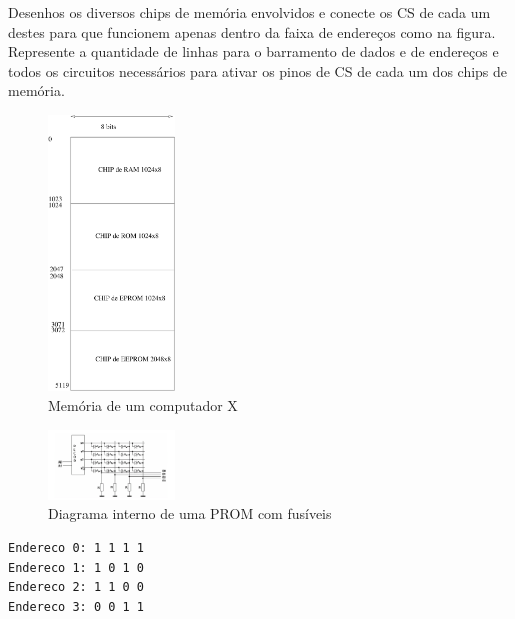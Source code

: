\documentclass[a4paper,10pt]{article}
\begin{document}
 Desenhos os diversos chips de memória envolvidos e conecte os CS de cada um destes para que funcionem apenas dentro da
faixa de endereços como na figura. Represente a quantidade de linhas para o barramento de dados e de endereços e todos os circuitos necessários para ativar os
pinos de CS de cada um dos chips de memória.


\begin{figure}[H]
 \centering\includegraphics[width=0.3\textwidth]{memoria3}
 \caption{Memória de um computador X}
 \label{fig:memoria3}
\end{figure}



\begin{figure}[H]
 \centering\includegraphics[width=0.3\textwidth]{prom}
 \caption{Diagrama interno de uma PROM com fusíveis}
 \label{fig:prom}
\end{figure}

\begin{verbatim}
Endereco 0: 1 1 1 1
Endereco 1: 1 0 1 0
Endereco 2: 1 1 0 0
Endereco 3: 0 0 1 1
\end{verbatim}
\end{document}
